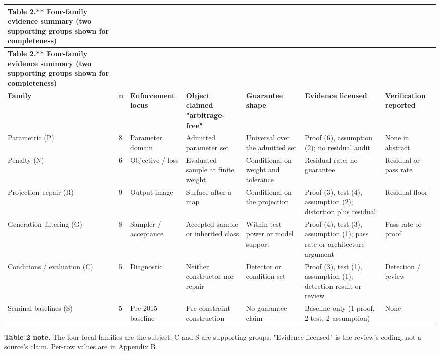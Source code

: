 \documentclass[11pt]{article}
\begin{document}
\begingroup\scriptsize
\begin{longtable}{@{}p{}p{}p{}p{}p{}p{}p{}@{}}
\toprule
\textbf{Table 2.** Four-family evidence summary (two supporting groups shown for completeness)} & \textbf{} & \textbf{} & \textbf{} & \textbf{} & \textbf{} & \textbf{} \\
\midrule
\endfirsthead
\toprule
\textbf{Table 2.** Four-family evidence summary (two supporting groups shown for completeness)} & \textbf{} & \textbf{} & \textbf{} & \textbf{} & \textbf{} & \textbf{} \\
\midrule
\endhead
\textbf{Family} & \textbf{n} & \textbf{Enforcement locus} & \textbf{Object claimed "arbitrage-free"} & \textbf{Guarantee shape} & \textbf{Evidence licensed} & \textbf{Verification reported} \\
Parametric (P) & 8 & Parameter domain & Admitted parameter set & Universal over the admitted set & Proof (6), assumption (2); no residual audit & None in abstract \\
Penalty (N) & 6 & Objective / loss & Evaluated sample at finite weight & Conditional on weight and tolerance & Residual rate; no guarantee & Residual or pass rate \\
Projection–repair (R) & 9 & Output image & Surface after a map & Conditional on the projection & Proof (3), test (4), assumption (2); distortion plus residual & Residual floor \\
Generation–filtering (G) & 8 & Sampler / acceptance & Accepted sample or inherited class & Within test power or model support & Proof (4), test (3), assumption (1); pass rate or architecture argument & Pass rate or proof \\
Conditions / evaluation (C) & 5 & Diagnostic & Neither constructor nor repair & Detector or condition set & Proof (3), test (1), assumption (1); detection result or review & Detection / review \\
Seminal baselines (S) & 5 & Pre-2015 baseline & Pre-constraint construction & No guarantee claim & Baseline only (1 proof, 2 test, 2 assumption) & None \\
\bottomrule
\end{longtable}
\endgroup

\textbf{Table 2 note.} The four focal families are the subject; C and S are supporting groups. "Evidence licensed" is the review's coding, not a source's claim. Per-row values are in Appendix B.
\end{document}
